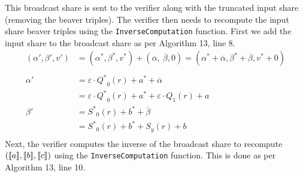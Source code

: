 \documentclass[11pt]{report}
\theoremstyle{definition}
\theoremstyle{plain}
\begin{document}
This broadcast share is sent to the verifier along with the truncated input share (removing the beaver triples). The verifier then needs to recompute the input share beaver triples using the \texttt{InverseComputation} function. First we add the input share to the broadcast share as per Algorithm 13, line 8.
\begin{align*}
  (\alpha', \beta', v') & = (\alpha^*, \beta^*, v^*) + (\overline{\alpha},\ \overline{\beta}, 0)
  = (\alpha^* + \overline{\alpha}, \beta^* + \overline{\beta}, v^* + 0)                          \\\\
  \alpha'               & = \varepsilon \cdot {Q^*}_0(r) + a^* + \overline{\alpha}               \\
                        & = \varepsilon \cdot {Q^*}_0(r) + a^* + \varepsilon \cdot Q_1(r) + a    \\
  \beta'                & = {S^*}_0(r) + b^* + \overline{\beta}                                  \\
                        & = {S^*}_0(r) + b^* + S_y(r) + b                                        \\
\end{align*}
Next, the verifier computes the inverse of the broadcast share to recompute $(\llbracket a \rrbracket, \llbracket b \rrbracket, \llbracket c \rrbracket)$ using the \texttt{InverseComputation} function. This is done as per Algorithm 13, line 10.
\end{document}

